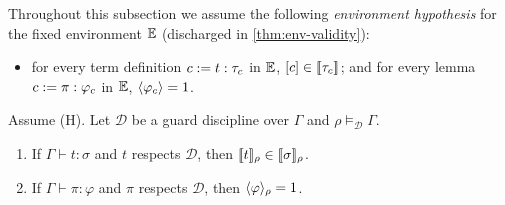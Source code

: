 Throughout this subsection we assume the following \emph{environment
hypothesis} for the fixed environment $\mathbb{E}$ (discharged in
\cref{thm:env-validity}):
\begin{itemize}[leftmargin=2em]
\item[(H)] for every term definition $c \mathrel{:=} t : \tau_c$ in $\mathbb{E}$,
  $[c] \in [\![ \tau_c ]\!]_{}$; and for every lemma $c \mathrel{:=} \pi :
  \varphi_c$ in $\mathbb{E}$, $\langle \varphi_c \rangle = 1$.
\end{itemize}

\begin{lemma}
\label{lem:fundamental}
Assume (H).  Let $\mathcal{D}$ be a guard discipline over $\Gamma$ and
$\rho \vDash_{\mathcal{D}} \Gamma$.
\begin{enumerate}[leftmargin=2em]
\item If $\Gamma \vdash t : \sigma$ and $t$ respects $\mathcal{D}$, then
  $[\![ t ]\!]_\rho \in [\![ \sigma ]\!]_{\rho}$.
\item If $\Gamma \vdash \pi : \varphi$ and $\pi$ respects $\mathcal{D}$,
  then $\langle \varphi \rangle_{\rho} = 1$.
\end{enumerate}
\end{lemma}

